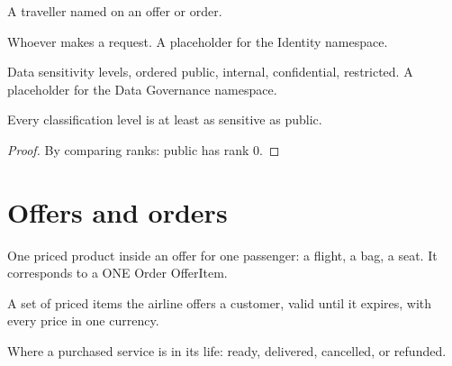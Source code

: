 \begin{definition}[Passenger]
  \label{def:passenger}
  A traveller named on an offer or order.
\end{definition}

\begin{definition}[Principal]
  \label{def:principal}
  Whoever makes a request.  A placeholder for the Identity namespace.
\end{definition}

\begin{definition}[Classification]
  \label{def:classification}
  Data sensitivity levels, ordered public, internal, confidential,
  restricted.  A placeholder for the Data Governance namespace.
\end{definition}

\begin{theorem}
  \label{thm:public-le}
  Every classification level is at least as sensitive as public.
\end{theorem}
\begin{proof}
  By comparing ranks: public has rank 0.
\end{proof}

\section{Offers and orders}

\begin{definition}
  \label{def:offer-item}
  One priced product inside an offer for one passenger: a flight, a bag, a
  seat.  It corresponds to a ONE Order OfferItem.
\end{definition}

\begin{definition}[Offer]
  \label{def:offer}
  A set of priced items the airline offers a customer, valid until it
  expires, with every price in one currency.
\end{definition}

\begin{definition}
  \label{def:delivery-state}
  Where a purchased service is in its life: ready, delivered, cancelled, or
  refunded.
\end{definition}


